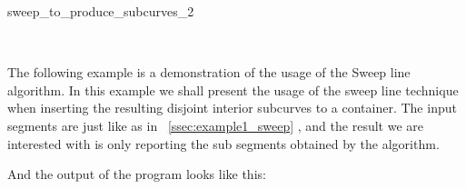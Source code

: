 \begin{ccRefFunction}{sweep_to_produce_subcurves_2}
\ccSeeAlso

 \\



\ccExample
\label{ssec:example3_sweep}
The following example is a demonstration of the usage of the \ccc
{Sweep line} algorithm. In this example we shall present the usage of
the sweep line technique when inserting the resulting disjoint
interior subcurves to a container. The input segments are just like as
in ~\ref{ssec:example1_sweep} , and the result we are interested with
is only reporting the sub segments obtained by the 
algorithm.


And the output of the program looks like this:


\end{ccRefFunction}













